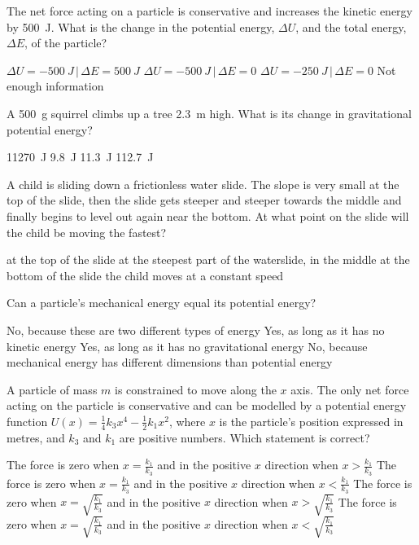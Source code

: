\question The net force acting on a particle is conservative and increases the kinetic energy by \SI{500}{J}. What is the change in the potential energy, $\Delta U$, and the total energy, $\Delta E$, of the particle?   
\begin{checkboxes}
\choice $\Delta U = \SI{-500}{J}\,|\,\Delta E = \SI{500}{J}$
\CorrectChoice $\Delta U = \SI{-500}{J}\,|\,\Delta E = 0$ \correct
\choice $\Delta U = \SI{-250}{J}\,|\,\Delta E = 0$
\choice Not enough information
\end{checkboxes}

\question A \SI{500}{g} squirrel climbs up a tree \SI{2.3}{m} high. What is its change in gravitational potential energy?
\begin{checkboxes}
\choice \SI{11270}{J} 
\choice \SI{9.8}{J}
\CorrectChoice \SI{11.3}{J} \correct
\choice \SI{112.7}{J}
\end{checkboxes}

\question A child is sliding down a frictionless water slide. The slope is very small at the top of the slide, then the slide gets steeper and steeper towards the middle and finally begins to level out again near the bottom. At what point on the slide will the child be moving the fastest?
\begin{checkboxes}
\choice at the top of the slide
\choice at the steepest part of the waterslide, in the middle
\CorrectChoice  at the bottom of the slide \correct
\choice the child moves at a constant speed
\end{checkboxes}	

\question  Can a particle's mechanical energy equal its potential energy?
\begin{checkboxes}
\choice No, because these are two different types of energy
\CorrectChoice Yes, as long as it has no kinetic energy \correct
\choice  Yes, as long as it has no gravitational energy
\choice No, because mechanical energy has different dimensions than potential energy
\end{checkboxes}	


\question A particle of mass $m$ is constrained to move along the $x$ axis. The only net force acting on the particle is conservative and can be modelled by a potential energy function $U(x)=\frac{1}{4}k_3x^4-\frac{1}{2}k_1x^2$, where $x$ is the particle's position expressed in metres, and $k_3$ and $k_1$ are positive numbers. Which statement is correct?
\begin{checkboxes} 
\choice The force is zero when $x=\frac{k_1}{k_3}$ and in the positive $x$ direction when $x>\frac{k_1}{k_3}$
\choice The force is zero when $x=\frac{k_1}{k_3}$ and in the positive $x$ direction when $x<\frac{k_1}{k_3}$
\choice The force is zero when $x=\sqrt{\frac{k_1}{k_3}}$ and in the positive $x$ direction when $x>\sqrt{\frac{k_1}{k_3}}$
\CorrectChoice The force is zero when $x=\sqrt{\frac{k_1}{k_3}}$ and in the positive $x$ direction when $x<\sqrt{\frac{k_1}{k_3}}$ \correct
\end{checkboxes}

